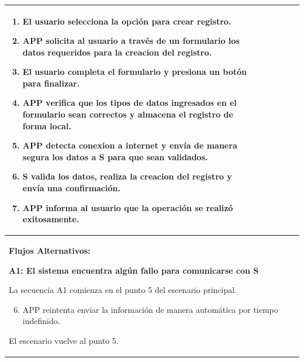 \begin{longtable}{|l|p{5.5cm}|l|p{2cm}|l|p{1.9cm}|}
{				\begin{enumerate}
					\item El usuario selecciona la opción para crear registro.
					\item APP solicita al usuario a través de un formulario los datos requeridos para la creacion del registro.
					\item El usuario completa el formulario y presiona un botón para finalizar.
					\item APP verifica que los tipos de datos ingresados en el formulario sean correctos y almacena el registro de forma local.
					\item APP detecta conexion a internet y envía de manera segura los datos a S para que sean validados.
					\item S valida los datos, realiza la creacion del registro y envía una confirmación.
					\item APP informa al usuario que la operación se realizó exitosamente.
				\end{enumerate}

				} \\ \hline

				\multicolumn{6}{|p{15cm}|}{ \textbf{Flujos Alternativos: }

				\textbf{A1: El sistema encuentra algún fallo para comunicarse con S}
				
				La secuencia A1 comienza en el punto 5 del escenario principal.
				\begin{enumerate}
						\setcounter{enumi}{5}
						\item APP reintenta enviar la información de manera automática por tiempo indefinido.
				\end{enumerate}

				El escenario vuelve al punto 5.

				} \\ \hline

			\end{longtable}

